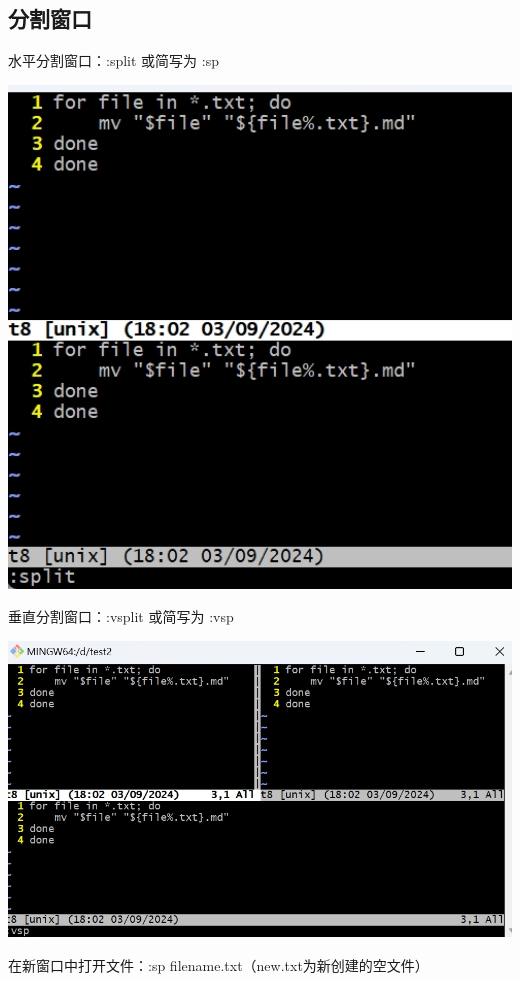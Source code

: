 \documentclass[UTF8,a4paper]{ctexart}
\begin{document}
\begin{sloppypar}
	\subsection{分割窗口}
	水平分割窗口：:split 或简写为 :sp
	
	\includegraphics[width = 16cm]{57}
	
	垂直分割窗口：:vsplit 或简写为 :vsp
	
	\includegraphics[width = 16cm]{58}
	
	在新窗口中打开文件：:sp filename.txt（new.txt为新创建的空文件）
	

\end{sloppypar}
\end{document}
